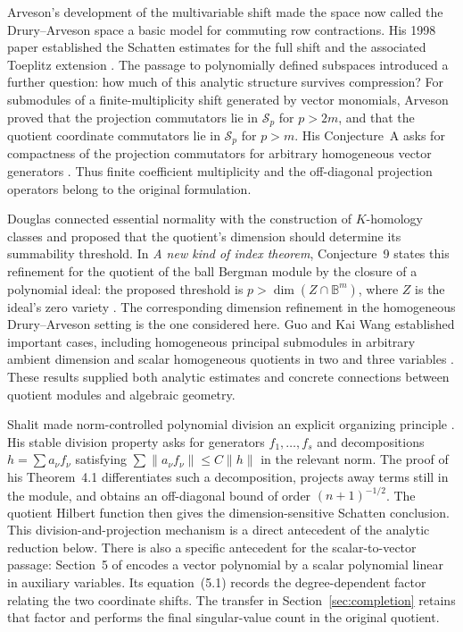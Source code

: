 \documentclass[11pt,reqno]{amsart}
\numberwithin{equation}{section}
\theoremstyle{definition}
\theoremstyle{remark}
\newcommand{\cS}{\mathcal S}
\begin{document}
Arveson's development of the multivariable shift made the space now called
the Drury--Arveson space a basic model for commuting row contractions.
His 1998 paper established the Schatten estimates for the full shift and
the associated Toeplitz extension
\cite[Proposition~5.3 and Theorem~5.7]{Arveson1998}.
The passage to polynomially defined subspaces introduced a further
question: how much of this analytic structure survives compression?
For submodules of a finite-multiplicity shift generated by vector
monomials, Arveson proved that the projection commutators lie in
$\cS_p$ for $p>2m$, and that the quotient coordinate commutators lie in
$\cS_p$ for $p>m$.  His Conjecture~A asks for compactness of the
projection commutators for arbitrary homogeneous vector generators
\cite[Theorem~2.1, Corollary~2.2 and Section~5]{Arveson2005}.
Thus finite coefficient multiplicity and the off-diagonal projection
operators belong to the original formulation.

Douglas connected essential normality with the construction of
$K$-homology classes and proposed that the quotient's dimension should
determine its summability threshold.  In \emph{A new kind of index
theorem}, Conjecture~9 states this refinement for the quotient of the
ball Bergman module by the closure of a polynomial ideal: the proposed
threshold is $p>\dim(Z\cap\mathbb B^m)$, where $Z$ is the ideal's zero
variety \cite{DouglasIndex}.  The corresponding dimension refinement in
the homogeneous Drury--Arveson setting is the one considered here.
Guo and Kai Wang established important cases, including homogeneous
principal submodules in arbitrary ambient dimension and scalar homogeneous
quotients in two and three variables \cite{GuoWang}.
These results supplied both analytic estimates and concrete connections
between quotient modules and algebraic geometry.

Shalit made norm-controlled polynomial division an explicit organizing
principle \cite{ShalitDivision}.  His stable division property asks for
generators $f_1,\ldots,f_s$ and decompositions
$h=\sum a_\nu f_\nu$ satisfying
$\sum\|a_\nu f_\nu\|\le C\|h\|$ in the relevant norm.
The proof of his Theorem~4.1 differentiates such a decomposition,
projects away terms still in the module, and obtains an off-diagonal
bound of order $(n+1)^{-1/2}$.  The quotient Hilbert function then gives
the dimension-sensitive Schatten conclusion.  This division-and-projection
mechanism is a direct antecedent of the analytic reduction below.
There is also a specific antecedent for the scalar-to-vector passage:
Section~5 of \cite{ShalitDivision} encodes a vector polynomial by a
scalar polynomial linear in auxiliary variables.  Its equation~(5.1)
records the degree-dependent factor relating the two coordinate shifts.
The transfer in Section~\ref{sec:completion} retains that factor and
performs the final singular-value count in the original quotient.
\end{document}
